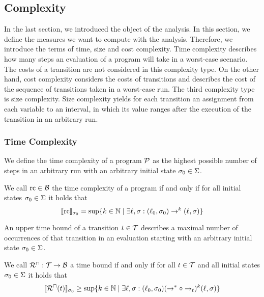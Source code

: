 \subsection{Complexity}

In the last section, we introduced the object of the analysis.
In this section, we define the measures we want to compute with the analysis.
Therefore, we introduce the terms of time, size and cost complexity.
Time complexity describes how many steps an evaluation of a program will take in a worst-case scenario.
The costs of a transition are not considered in this complexity type.
On the other hand, cost complexity considers the costs of transitions and describes the cost of the sequence of transitions taken in a worst-case run.
The third complexity type is size complexity.
Size complexity yields for each transition an assignment from each variable to an interval, in which its value ranges after the execution of the transition in an arbitrary run.

\subsubsection{Time Complexity}

We define the time complexity of a program $\mathcal{P}$ as the highest possible number of steps in an arbitrary run with an arbitrary initial state $\sigma_0 \in \Sigma$.

\begin{definition}
  We call $\text{rc} \in \mathcal{B}$ the time complexity of a program if and only if for all initial states $\sigma_0 \in \Sigma$ it holds that
  \[ \llbracket \text{rc} \rrbracket_{\sigma_0} = \sup \lbrace  k \in \mathbb{N} \mid \exists \ell, \sigma: (\ell_0, \sigma_0) \rightarrow^k (\ell, \sigma)  \rbrace \]
\end{definition}

An upper time bound of a transition $t \in \mathcal{T}$ describes a maximal number of occurrences of that transition in an evaluation starting with an arbitrary initial state $\sigma_0 \in \Sigma$.

\begin{definition}
  We call ${\mathcal{R}^\sqcap}: \mathcal{T} \rightarrow \mathcal{B}$ a time bound if and only if for all $t \in \mathcal{T}$ and all initial states $\sigma_0 \in \Sigma$ it holds that
  \[ \llbracket {\mathcal{R}^\sqcap}(t) \rrbracket_{\sigma_0} \geq \sup \lbrace  k \in \mathbb{N} \mid \exists \ell, \sigma: (\ell_0, \sigma_0) (\rightarrow^* \circ \rightarrow_t)^k (\ell, \sigma)  \rbrace \]
\end{definition}

